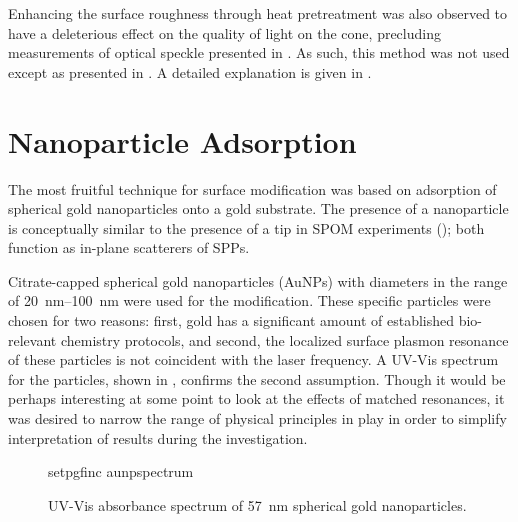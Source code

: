 Enhancing the surface roughness through heat pretreatment was also observed to
have a deleterious effect on the quality of light on the cone, precluding
measurements of optical speckle presented in .  As such,
this method was not used except as presented in .  A
detailed explanation is given in .

\section{Nanoparticle Adsorption}
The most fruitful technique for surface modification was based on adsorption
of spherical gold nanoparticles onto a gold substrate.  The presence of a
nanoparticle is conceptually similar to the presence of a tip in SPOM
experiments (); both function as in-plane scatterers of
SPPs.  

Citrate-capped spherical gold nanoparticles (AuNPs)
with diameters in the range of \SIrange{20}{100}{\nano\meter} were used for
the modification.  These specific particles were chosen for two reasons:
first, gold has a significant amount of established bio-relevant chemistry
protocols, and second, the localized surface plasmon resonance of these
particles is not coincident with the laser frequency.  A UV-Vis spectrum
for the particles, shown in , confirms the second
assumption.  Though it would be perhaps interesting at some point to look
at the effects of matched resonances, it was desired to narrow the range of
physical principles in play in order to simplify interpretation of results
during the investigation.

\begin{figure}[ht]
 \centering
 {setpgfinc}
 {aunpspectrum}
 \caption{UV-Vis absorbance spectrum of \SI{57}{\nano\meter} spherical gold
 nanoparticles.}
\label{fig:aunpspectrum}
\end{figure}


